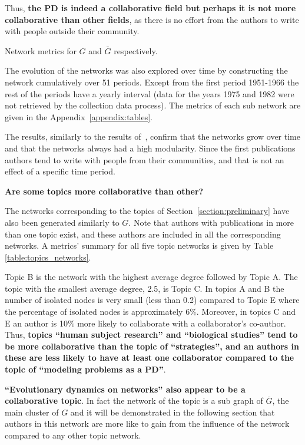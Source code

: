 \documentclass{article}
\theoremstyle{definition}
\begin{document}
Thus, \textbf{the PD is indeed a collaborative field but perhaps it is not
more collaborative than other fields}, as there is no effort from the authors
to write with people outside their community.

\begin{table}[!hbtp]
    \centering
    \resizebox{\textwidth}{!}{
    }
    \caption{Network metrics for \(G\) and \(\bar{G}\) respectively.}
    \label{table:network_comparison}
\end{table}

The evolution of the networks was also explored over time by constructing the
network cumulatively over 51 periods. Except from the first period 1951-1966 the
rest of the periods have a yearly interval (data for the years 1975 and 1982
were not retrieved by the collection data process). The metrics of each sub
network are given in the Appendix~\ref{appendix:tables}.

The results, similarly to the results of~\cite{Liu2015}, confirm that the
networks grow over time and that the networks always had a high modularity.
Since the first publications authors tend to write with people from their
communities, and that is not an effect of a specific time period.

\textbf{Are some topics more collaborative than other?}

The networks corresponding to the topics of Section~\ref{section:preliminary} have
also been generated similarly to \(G\). Note that authors with publications in
more than one topic exist, and these authors are included in all the corresponding
networks. A metrics' summary for all five topic networks is given by Table
\ref{table:topics_networks}.

Topic B is the network with the highest average degree followed by Topic A. The
topic with the smallest average degree, 2.5, is Topic C. In topics A and B the
number of isolated nodes is very small (less than 0.2) compared to Topic E where the
percentage of isolated nodes is approximately 6\%. Moreover, in topics C and E
an author is 10\% more likely to collaborate with a collaborator's co-author.
Thus, \textbf{topics ``human subject research'' and ``biological studies'' tend
to be more collaborative than the topic of ``strategies'', and an authors in
these are less likely to have at least one collaborator compared to the topic of
``modeling problems as a PD''}.

\textbf{``Evolutionary dynamics on networks'' also appear to be a collaborative topic}.
In fact the network of the topic  is a
sub graph of \(\bar{G}\), the main cluster of \(G\) and it will be demonstrated in the following section that
authors in this network are more like to gain from the influence of the network
compared to any other topic network.
\end{document}
